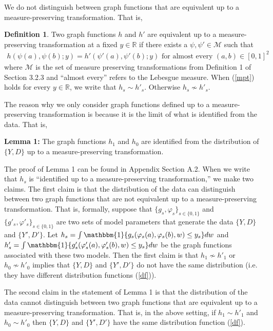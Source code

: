 \documentclass[12pt]{article}
\theoremstyle{definition}
\newtheorem{definition}{Definition}
\begin{document}
We do not distinguish between graph functions that are equivalent up to a measure-preserving transformation. That is,
\begin{definition} Two graph functions $h$ and $h'$ are equivalent up to a measure-preserving transformation at a fixed $y \in \mathbb{R}$ if there exists a $\psi, \psi' \in \mathcal{M}$ such that  
\begin{align}\label{mpt}
h(\psi(a),\psi(b);y) = h'(\psi'(a),\psi'(b);y) \text{ for almost every } (a,b) \in [0,1]^2
\end{align} 
where $\mathcal{M}$ is the set of measure preserving transformations from Definition 1 of Section 3.2.3 and ``almost every'' refers to the Lebesgue measure. When (\ref{mpt}) holds for every $y \in \mathbb{R}$, we write that $h_{s} \sim h'_{s}$. Otherwise $h_{s} \not\sim h'_{s}$.  
\end{definition}
The reason why we only consider graph functions defined up to a measure-preserving transformation is because it is the limit of what is identified from the data. That is, 

\begin{flushleft}
\textbf{Lemma 1:} The graph functions $h_{1}$ and $h_0$ are identified from the distribution of $\{Y,D\}$ up to a measure-preserving transformation. \end{flushleft}

The proof of Lemma 1 can be found in Appendix Section A.2. When we write that $h_{s}$ is ``identified up to a measure-preserving transformation,'' we make two claims. The first claim is that the distribution of the data can distinguish between two graph functions that are not equivalent up to a measure-preserving transformation. That is, formally, suppose that $\{g_s,\varphi_s\}_{s \in \{0,1\}}$  and $\{g'_s,\varphi'_s\}_{s \in \{0,1\}}$ are two sets of model parameters that generate the data $\{Y,D\}$ and $\{Y',D'\}$. Let $h_{s} =  \int \mathbbm{1}\{g_{s}(\varphi_s(a),\varphi_s(b),w) \leq y_s\}dw$  and $h'_{s} =  \int \mathbbm{1}\{g'_{s}(\varphi'_s(a),\varphi'_s(b),w) \leq y_s\}dw$ be the graph functions associated with these two models. Then the first claim is that $h_{1} \not\sim h'_{1}$ or $h_{0} \not\sim h'_{0}$ implies that $\{Y,D\}$ and $\{Y',D'\}$ do not have the same distribution (i.e. they have different distribution functions (\ref{df})). 

The second claim in the statement of Lemma 1 is that the distribution of the data cannot distinguish between two graph functions that are equivalent up to a measure-preserving transformation. That is, in the above setting, if $h_{1} \sim h'_{1}$ and $h_0 \sim h'_0$ then $\{Y,D\}$ and $\{Y',D'\}$ have the same distribution function  (\ref{df}).
\end{document}
